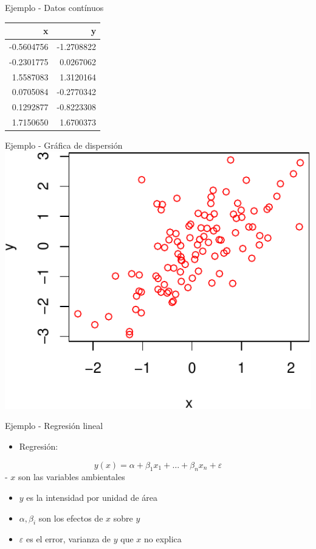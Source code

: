 \documentclass[
  11pt,
  ignorenonframetext,
]{beamer}
\providecommand{\tightlist}{%
  \setlength{\itemsep}{0pt}\setlength{\parskip}{0pt}}
\begin{document}
\begin{frame}{Ejemplo - Datos contínuos}
\protect\hypertarget{ejemplo---datos-contuxednuos}{}
\begin{longtable}[]{@{}rr@{}}
\toprule()
x & y \\
\midrule()
\endhead
-0.5604756 & -1.2708822 \\
-0.2301775 & 0.0267062 \\
1.5587083 & 1.3120164 \\
0.0705084 & -0.2770342 \\
0.1292877 & -0.8223308 \\
1.7150650 & 1.6700373 \\
\bottomrule()
\end{longtable}
\end{frame}

\begin{frame}{Ejemplo - Gráfica de dispersión}
\protect\hypertarget{ejemplo---gruxe1fica-de-dispersiuxf3n}{}
\includegraphics{Generalidades_files/figure-beamer/unnamed-chunk-2-1.pdf}
\end{frame}

\begin{frame}{Ejemplo - Regresión lineal}
\protect\hypertarget{ejemplo---regresiuxf3n-lineal}{}
\begin{itemize}
\tightlist
\item
  Regresión:
\end{itemize}

\[ y(x) = \alpha + \beta_1 x_1 + \dots + \beta_n x_n + \varepsilon\] -
\(x\) son las variables ambientales

\begin{itemize}
\item
  \(y\) es la intensidad por unidad de área
\item
  \(\alpha, \beta_i\) son los efectos de \(x\) sobre \(y\)
\item
  \(\varepsilon\) es el error, varianza de \(y\) que \(x\) no explica
\end{itemize}
\end{frame}
\end{document}
